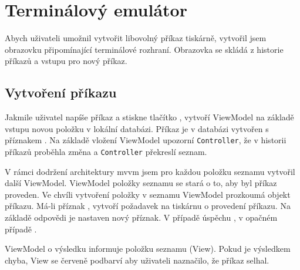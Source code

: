 \section{Terminálový emulátor}

Abych uživateli umožnil vytvořit libovolný příkaz tiskárně, vytvořil jsem obrazovku připomínající terminálové rozhraní.
Obrazovka se skládá z historie příkazů a vstupu pro nový příkaz.

\subsection{Vytvoření příkazu}

Jakmile uživatel napíše příkaz a stiskne tlačítko , vytvoří ViewModel na základě vstupu novou položku v lokální databázi.
Příkaz je v databázi vytvořen s příznakem .
Na základě vložení ViewModel upozorní \texttt{Controller}, že v historii příkazů proběhla změna a \texttt{Controller} překreslí seznam.

V rámci dodržení architektury \acrshort{mvvm} jsem pro každou položku seznamu vytvořil další ViewModel.
ViewModel položky seznamu se stará o to, aby byl příkaz proveden.
Ve chvíli vytvoření položky v seznamu ViewModel prozkoumá objekt příkazu.
Má-li příznak , vytvoří požadavek na tiskárnu o provedení příkazu.
Na základě odpovědi je nastaven nový příznak.
V případě úspěchu , v opačném případě .

ViewModel o výsledku informuje položku seznamu (View).
Pokud je výsledkem chyba, View se červeně podbarví aby uživateli naznačilo, že příkaz selhal.
